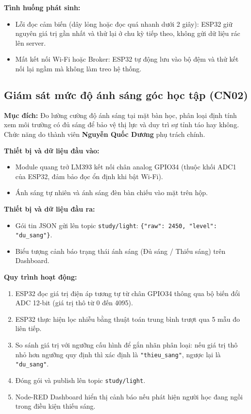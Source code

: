 \textbf{Tình huống phát sinh:}
\begin{itemize}
    \item Lỗi đọc cảm biến (dây lỏng hoặc đọc quá nhanh dưới 2 giây): ESP32 giữ nguyên giá trị gần nhất và thử lại ở chu kỳ tiếp theo, không gửi dữ liệu rác lên server.
    \item Mất kết nối Wi-Fi hoặc Broker: ESP32 tự động lưu vào bộ đệm và thử kết nối lại ngầm mà không làm treo hệ thống.
\end{itemize}

\subsection{Giám sát mức độ ánh sáng góc học tập (CN02)}
\textbf{Mục đích:}
Đo lường cường độ ánh sáng tại mặt bàn học, phân loại định tính xem môi trường có đủ sáng để bảo vệ thị lực và duy trì sự tỉnh táo hay không. Chức năng do thành viên \textbf{Nguyễn Quốc Dương} phụ trách chính.

\textbf{Thiết bị và dữ liệu đầu vào:}
\begin{itemize}
    \item Module quang trở LM393 kết nối chân analog GPIO34 (thuộc khối ADC1 của ESP32, đảm bảo đọc ổn định khi bật Wi-Fi).
    \item Ánh sáng tự nhiên và ánh sáng đèn bàn chiếu vào mặt trên hộp.
\end{itemize}

\textbf{Thiết bị và dữ liệu đầu ra:}
\begin{itemize}
    \item Gói tin JSON gửi lên topic \texttt{study/light}: \texttt{\{"raw": 2450, "level": "du\_sang"\}}.
    \item Biểu tượng cảnh báo trạng thái ánh sáng (Đủ sáng / Thiếu sáng) trên Dashboard.
\end{itemize}

\textbf{Quy trình hoạt động:}
\begin{enumerate}
    \item ESP32 đọc giá trị điện áp tương tự từ chân GPIO34 thông qua bộ biến đổi ADC 12-bit (giá trị thô từ 0 đến 4095).
    \item ESP32 thực hiện lọc nhiễu bằng thuật toán trung bình trượt qua 5 mẫu đo liên tiếp.
    \item So sánh giá trị với ngưỡng cấu hình để gắn nhãn phân loại: nếu giá trị thô nhỏ hơn ngưỡng quy định thì xác định là \texttt{"thieu\_sang"}, ngược lại là \texttt{"du\_sang"}.
    \item Đóng gói và publish lên topic \texttt{study/light}.
    \item Node-RED Dashboard hiển thị cảnh báo nếu phát hiện người học đang ngồi trong điều kiện thiếu sáng.
\end{enumerate}

